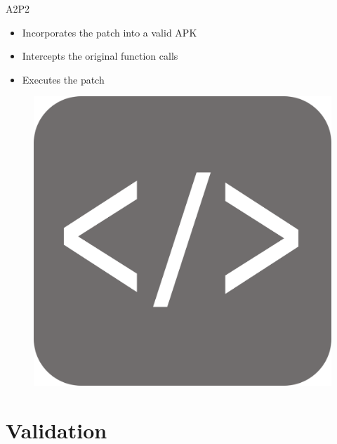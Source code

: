 \documentclass[aspectratio=169]{beamer}
[aspectratio=169] %
\begin{document}
\begin{frame}{A2P2}
  \begin{minipage}{0.49\textwidth} 
    \begin{itemize}
      \item Incorporates the patch into a valid APK
      \item Intercepts the original function calls
      \item Executes the patch
    \end{itemize}
  \end{minipage}
  \hfill
  \begin{minipage}{0.49\textwidth} 
    \begin{figure}
      \centering
      \includegraphics[height=0.5\textheight]{figures/code.png}
    \end{figure}
  \end{minipage}
\end{frame}

\section{Validation}
\end{document}
